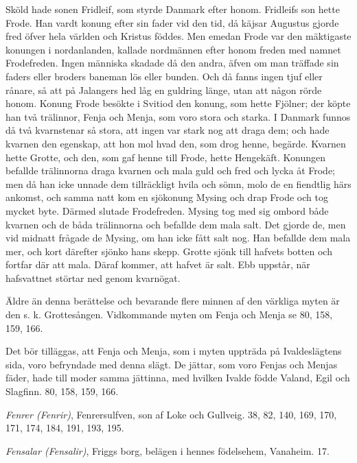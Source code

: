 Sköld hade sonen Fridleif, som styrde Danmark efter honom. Fridleifs son
hette Frode. Han vardt konung efter sin fader vid den tid, då käjsar
Augustus gjorde fred öfver hela världen och Kristus föddes. Men emedan
Frode var den mäktigaste konungen i nordanlanden, kallade nordmännen
efter honom freden med namnet Frodefreden. Ingen människa skadade då den
andra, äfven om man träffade sin faders
\protect\hypertarget{lb1625905.xhtmlux5cux23start215}{}{}\protect\hypertarget{lb1625905.xhtmlux5cux23start215-a}{}{}\protect\hypertarget{lb1625905.xhtmlux5cux23start215-b}{}{}\protect\hypertarget{lb1625905.xhtmlux5cux23start215-c}{}{}\protect\hypertarget{lb1625905.xhtmlux5cux23start215-d}{}{}
eller broders baneman lös eller bunden. Och då fanns ingen tjuf eller
rånare, så att på Jalangers hed låg en guldring länge, utan att någon
rörde honom. Konung Frode besökte i Svitiod den konung, som hette
Fjölner; der köpte han två trälinnor, Fenja och Menja, som voro stora
och starka. I Danmark funnos då två kvarnstenar så stora, att ingen var
stark nog att draga dem; och hade kvarnen den egenskap, att hon mol hvad
den, som drog henne, begärde. Kvarnen hette Grotte, och den, som gaf
henne till Frode, hette Hengekäft. Konungen befallde trälinnorna draga
kvarnen och mala guld och fred och lycka åt Frode; men då han icke
unnade dem tillräckligt hvila och sömn, molo de en fiendtlig härs
ankomst, och samma natt kom en sjökonung Mysing och drap Frode och tog
mycket byte. Därmed slutade Frodefreden. Mysing tog med sig ombord både
kvarnen och de båda trälinnorna och befallde dem mala salt. Det gjorde
de, men vid midnatt frågade de Mysing, om han icke fått salt nog. Han
befallde dem mala mer, och kort därefter sjönko hans skepp. Grotte sjönk
till hafvets botten och fortfar där att mala. Däraf kommer, att hafvet
är salt. Ebb uppstår, när hafsvattnet störtar ned genom kvarnögat.

Äldre än denna berättelse och bevarande flere minnen af den värkliga
myten är den s. k. Grottesången. Vidkommande myten om Fenja och Menja se
80, 158, 159, 166.

Det bör tilläggas, att Fenja och Menja, som i myten uppträda på
Ivaldeslägtens sida, voro befryndade med denna slägt. De jättar, som
voro Fenjas och Menjas fäder, hade till moder samma jättinna, med
hvilken Ivalde födde Valand, Egil och Slagfinn. 80, 158, 159, 166.

\emph{Fenrer (Fenrir)}, Fenrersulfven, son af Loke och Gullveig. 38, 82,
140, 169, 170, 171, 174, 184, 191, 193, 195.

\emph{Fensalar (Fensalir)}, Friggs borg, belägen i hennes födelsehem,
Vanaheim. 17.

